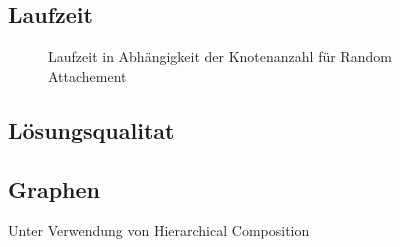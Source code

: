 \subsection{Laufzeit}
\begin{figure}
    \centering
    
    \caption{Laufzeit in Abhängigkeit der Knotenanzahl für Random Attachement}
\end{figure}

\subsection{Lösungsqualitat}
\subsection{Graphen}
Unter Verwendung von Hierarchical Composition

